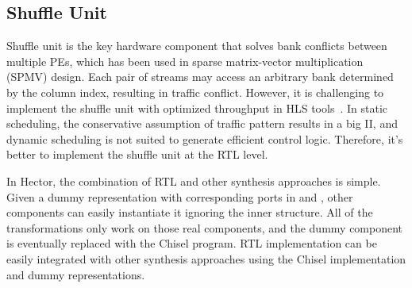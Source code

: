 \subsection{Shuffle Unit}
\label{sec:spmv}


Shuffle unit is the key hardware component that solves bank conflicts between multiple PEs, which has been used in sparse matrix-vector multiplication (SPMV) design. Each pair of streams may access an arbitrary bank determined by the column index, resulting in traffic conflict. However, it is challenging to implement the shuffle unit with optimized throughput in HLS tools~\cite{HiSparse}. In static scheduling, the conservative assumption of traffic pattern results in a big II, and dynamic scheduling is not suited to generate efficient control logic. Therefore, it's better to implement the shuffle unit at the RTL level. %

In Hector, the combination of RTL and other synthesis approaches is simple. Given a dummy representation with corresponding ports in \hec and \tor, other components can easily instantiate it ignoring the inner structure. All of the transformations only work on those real components, and the dummy component is eventually replaced with the Chisel program. RTL implementation can be easily integrated with other synthesis approaches using the Chisel implementation and dummy representations.

